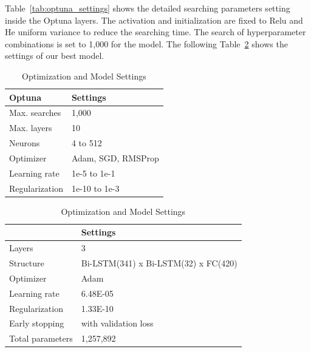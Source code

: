 Table~\ref{tab:optuna_settings} shows the detailed searching parameters setting inside the Optuna layers. 
The activation and initialization are fixed to Relu and He uniform variance to reduce the searching time. 
The search of hyperparameter combinations is set to 1,000 for the model. 
The following Table~\ref{tab:bestmodel} shows the settings of our best model.

\begin{table}[hbt]
    \centering
    \caption{Optimization and Model Settings}
    \label{tab:combined_tables}
    \begin{minipage}[t][6cm][t]{0.45\textwidth} %
        \centering
        \label{tab:optuna_settings}
        \begin{tabular}{@{}ll@{}}
            \toprule
            Optuna & Settings \\ \midrule
            Max. searches & 1,000 \\
            Max. layers & 10 \\ 
            Neurons & 4 to 512 \\ 
            Optimizer & Adam, SGD, RMSProp \\ 
            Learning rate & 1e-5 to 1e-1 \\ 
            Regularization & 1e-10 to 1e-3 \\
            \bottomrule
        \end{tabular}
    \end{minipage}
    \hfill
    \begin{minipage}[t][6cm][t]{0.45\textwidth} %
        \centering
        \label{tab:bestmodel}
        \begin{tabular}{@{}ll@{}}
            \toprule
             & Settings \\ \midrule
            Layers & 3 \\
            Structure & Bi-LSTM(341) x Bi-LSTM(32) x FC(420) \\ 
            Optimizer & Adam \\ 
            Learning rate & 6.48E-05 \\ 
            Regularization & 1.33E-10 \\
            Early stopping & with validation loss \\
            Total parameters & 1,257,892 \\
            \bottomrule
        \end{tabular}
    \end{minipage}
\end{table}

